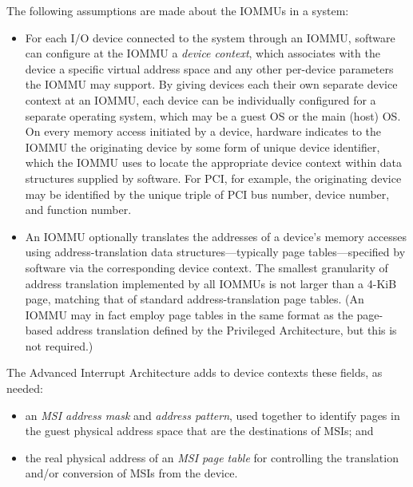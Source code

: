 The following assumptions are made about the \mbox{IOMMU}s in a system:
\begin{itemize}

\item
For each I/O device connected to the system through an \mbox{IOMMU},
software can configure at the \mbox{IOMMU} a \emph{device context}, which
associates with the device a specific virtual address space and any
other per-device parameters the \mbox{IOMMU} may support.
By giving devices each their own separate device context at an \mbox{IOMMU},
each device can be individually configured for a separate
operating system, which may be a guest OS or the main (host) OS.
On every memory access initiated by a device, hardware indicates to
the \mbox{IOMMU} the originating device by some form of unique device
identifier, which the \mbox{IOMMU} uses to locate the appropriate device
context within data structures supplied by software.
For PCI, for example, the originating device may be identified by the
unique triple of PCI bus number, device number, and function number.

\item
An \mbox{IOMMU} optionally translates the addresses of a device's memory
accesses using address-translation data structures---typically page
tables---specified by software via the corresponding device context.
The smallest granularity of address translation implemented by all
\mbox{IOMMU}s is not larger than a \mbox{4-KiB} page, matching that of
standard {\RISCV} address-translation page tables.
(An \mbox{IOMMU} may in fact employ page tables in the same format as the
page-based address translation defined by the {\RISCV} Privileged
Architecture, but this is not required.)

\end{itemize}

The Advanced Interrupt Architecture adds to device contexts these
fields, as needed:
\begin{itemize}

\item
an \emph{MSI address mask} and \emph{address pattern}, used together to
identify pages in the guest physical address space
that are the destinations of MSIs; and

\item
the real physical address of an \emph{MSI page table} for controlling
the translation and/or conversion of MSIs from the device.

\end{itemize}

